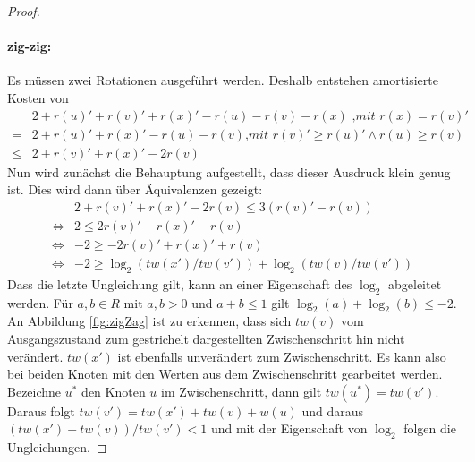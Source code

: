 \documentclass[a4paper,12pt]{article}
\begin{document}
\begin{proof}
	\paragraph{zig-zig:} 
	Es müssen zwei Rotationen ausgeführt werden. Deshalb entstehen amortisierte Kosten von
	\begin{align*}
	&2 + r\left(u\right)' +r\left(v\right)' +r\left(x\right)' - r\left(u\right)- r\left(v\right)- r\left(x\right) \textit{ ,mit $r\left(x\right) =  r\left(v\right)'$ }\\
	=& 2 + r\left(u\right)' +r\left(x\right)' - r\left(u\right)- r\left(v\right) \textit{,mit
		$r\left(v\right)' \geq  r\left(u\right)' \land r\left(u\right) \geq  r\left(v\right)$}\\
	\leq &  2 + r\left(v\right)' + r\left(x\right)' - 2 r\left(v\right) 
	\end{align*}
	Nun wird zunächst die Behauptung aufgestellt, dass dieser Ausdruck klein genug ist. Dies wird dann über Äquivalenzen gezeigt:
	\begin{align*}
	& 2 + r\left(v\right)' + r\left(x\right)' - 2 r\left(v\right) \leq  3\left(r\left(v\right)'- r\left(v\right)\right)\\
	\Leftrightarrow &2 \leq 2r\left(v\right)' -  r\left(x\right)' - r\left(v\right)\\
	\Leftrightarrow & -2 \geq -2r\left(v\right)' +  r\left(x\right)' + r\left(v\right)\\
	\Leftrightarrow & -2 \geq \log_2\left(\mathit{tw}\left(x'\right) / \mathit{tw}\left(v'\right)\right) + \log_2\left(\mathit{tw}\left(v\right) / \mathit{tw}\left(v'\right)\right)
	\end{align*}
	Dass die letzte Ungleichung gilt, kann an einer Eigenschaft des $\log_2$ abgeleitet werden. Für $a,b \in \mathit{R}$ mit $a,b > 0$ und $a + b \leq 1$ gilt $\log_2\left(a\right) + \log_2\left(b\right) \leq -2$. An Abbildung \ref{fig:zigZag} ist zu erkennen, dass sich $\mathit{tw}\left(v\right)$ vom Ausgangszustand zum gestrichelt dargestellten Zwischenschritt hin nicht verändert. $\mathit{tw}\left(x'\right)$ ist ebenfalls unverändert zum Zwischenschritt. Es kann also bei beiden Knoten mit den Werten aus dem Zwischenschritt gearbeitet werden. Bezeichne $u^*$ den Knoten $u$ im Zwischenschritt, dann gilt $ \mathit{tw}\left(u^*\right) = \mathit{tw}\left(v'\right)$. \\  Daraus folgt $\mathit{tw}\left(v'\right) = \mathit{tw}\left(x'\right) + \mathit{tw}\left(v\right) + w\left(u\right) $ und daraus \\ \mbox{$\left(\mathit{tw}\left(x'\right) + \mathit{tw}\left(v\right)\right) /  \mathit{tw}\left(v'\right) < 1$} und mit der Eigenschaft von $\log_2$ folgen die Ungleichungen.
	

\end{proof}
\end{document}
